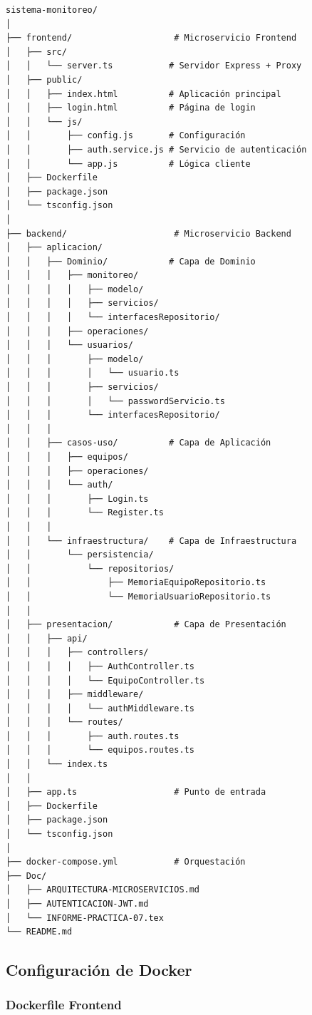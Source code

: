\documentclass[12pt,a4paper]{article}
\begin{document}
\begin{lstlisting}[caption=Estructura completa del proyecto]
sistema-monitoreo/
│
├── frontend/                    # Microservicio Frontend
│   ├── src/
│   │   └── server.ts           # Servidor Express + Proxy
│   ├── public/
│   │   ├── index.html          # Aplicación principal
│   │   ├── login.html          # Página de login
│   │   └── js/
│   │       ├── config.js       # Configuración
│   │       ├── auth.service.js # Servicio de autenticación
│   │       └── app.js          # Lógica cliente
│   ├── Dockerfile
│   ├── package.json
│   └── tsconfig.json
│
├── backend/                     # Microservicio Backend
│   ├── aplicacion/
│   │   ├── Dominio/            # Capa de Dominio
│   │   │   ├── monitoreo/
│   │   │   │   ├── modelo/
│   │   │   │   ├── servicios/
│   │   │   │   └── interfacesRepositorio/
│   │   │   ├── operaciones/
│   │   │   └── usuarios/
│   │   │       ├── modelo/
│   │   │       │   └── usuario.ts
│   │   │       ├── servicios/
│   │   │       │   └── passwordServicio.ts
│   │   │       └── interfacesRepositorio/
│   │   │
│   │   ├── casos-uso/          # Capa de Aplicación
│   │   │   ├── equipos/
│   │   │   ├── operaciones/
│   │   │   └── auth/
│   │   │       ├── Login.ts
│   │   │       └── Register.ts
│   │   │
│   │   └── infraestructura/    # Capa de Infraestructura
│   │       └── persistencia/
│   │           └── repositorios/
│   │               ├── MemoriaEquipoRepositorio.ts
│   │               └── MemoriaUsuarioRepositorio.ts
│   │
│   ├── presentacion/            # Capa de Presentación
│   │   ├── api/
│   │   │   ├── controllers/
│   │   │   │   ├── AuthController.ts
│   │   │   │   └── EquipoController.ts
│   │   │   ├── middleware/
│   │   │   │   └── authMiddleware.ts
│   │   │   └── routes/
│   │   │       ├── auth.routes.ts
│   │   │       └── equipos.routes.ts
│   │   └── index.ts
│   │
│   ├── app.ts                   # Punto de entrada
│   ├── Dockerfile
│   ├── package.json
│   └── tsconfig.json
│
├── docker-compose.yml           # Orquestación
├── Doc/
│   ├── ARQUITECTURA-MICROSERVICIOS.md
│   ├── AUTENTICACION-JWT.md
│   └── INFORME-PRACTICA-07.tex
└── README.md
\end{lstlisting}

\subsection{Configuración de Docker}

\subsubsection{Dockerfile Frontend}
\end{document}

